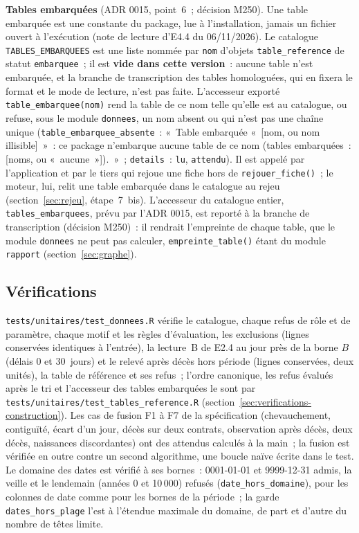 \documentclass[a4paper,11pt]{article}
\newcommand{\code}[1]{\texttt{\small #1}}
\begin{document}
\medskip
\noindent
\textbf{Tables embarquées} (ADR 0015, point~6~; décision M250). Une table
embarquée est une constante du package, lue à l'installation, jamais un
fichier ouvert à l'exécution (note de lecture d'E4.4 du 06/11/2026). Le
catalogue \code{TABLES\_EMBARQUEES} est une liste nommée par \code{nom}
d'objets \code{table\_reference} de statut \code{embarquee}~; il est
\textbf{vide dans cette version}~: aucune table n'est embarquée, et la
branche de transcription des tables homologuées, qui en fixera le format et
le mode de lecture, n'est pas faite. L'accesseur exporté
\code{table\_embarquee(nom)} rend la table de ce nom telle qu'elle est au
catalogue, ou refuse, sous le module \code{donnees}, un nom absent ou qui
n'est pas une chaîne unique (\code{table\_embarquee\_absente}~:
«~Table embarquée «~[nom, ou nom illisible]~»~: ce package n'embarque
aucune table de ce nom (tables embarquées~: [noms, ou «~aucune~»]).~»~;
\code{details}~: \code{lu}, \code{attendu}). Il est appelé par
l'application et par le tiers qui rejoue une fiche hors de
\code{rejouer\_fiche()}~; le moteur, lui, relit une table embarquée dans le
catalogue au rejeu (section~\ref{sec:rejeu}, étape~7~bis). L'accesseur du
catalogue entier, \code{tables\_embarquees}, prévu par l'ADR 0015, est
reporté à la branche de transcription (décision M250)~: il rendrait
l'empreinte de chaque table, que le module \code{donnees} ne peut pas
calculer, \code{empreinte\_table()} étant du module \code{rapport}
(section~\ref{sec:graphe}).

\subsection{Vérifications}
\label{sec:verifications-donnees}

\code{tests/unitaires/test\_donnees.R} vérifie le catalogue, chaque refus de
rôle et de paramètre, chaque motif et les règles d'évaluation, les exclusions
(lignes conservées identiques à l'entrée), la lecture~B de E2.4 au jour près
de la borne $B$ (délais 0 et 30~jours) et le relevé après décès hors période
(lignes conservées, deux unités), la table de référence et ses refus~;
l'ordre canonique, les refus évalués après le tri et l'accesseur des tables
embarquées le sont par \code{tests/unitaires/test\_tables\_reference.R}
(section~\ref{sec:verifications-construction}). Les cas
de fusion F1 à F7 de la spécification (chevauchement, contiguïté, écart d'un
jour, décès sur deux contrats, observation après décès, deux décès,
naissances discordantes) ont des attendus calculés à la main~; la fusion est
vérifiée en outre contre un second algorithme, une boucle naïve écrite dans
le test. Le domaine des dates est vérifié à ses bornes~: 0001-01-01 et
9999-12-31 admis, la veille et le lendemain (années 0 et 10\,000) refusés
(\code{date\_hors\_domaine}), pour les colonnes de date comme pour les
bornes de la période~; la garde \code{dates\_hors\_plage} l'est à l'étendue
maximale du domaine, de part et d'autre du nombre de têtes limite.
\end{document}
